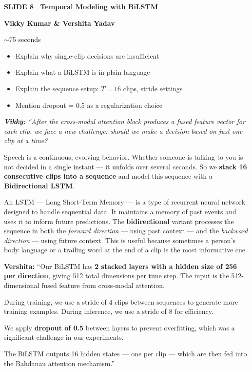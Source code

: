 \documentclass[11pt, a4paper]{article}
\newcommand{\slideheading}[3]{%
  \vspace{0.6cm}
  \begin{tcolorbox}[slidebox]
    \textbf{\color{NavyBlue}SLIDE #1 \textemdash\ #2}\\[2pt]
    \begin{tcolorbox}[presenterbox, title=Presenter(s)]
      \color{AccBlue}\bfseries #3
    \end{tcolorbox}
  \end{tcolorbox}
}
\newcommand{\timing}[1]{%
  \begin{tcolorbox}[timebox, title=Suggested Time]
    \color{AccOrange} #1
  \end{tcolorbox}
}
\newcommand{\keypoints}[1]{%
  \begin{tcolorbox}[keybox, title=Key Points to Cover]
    #1
  \end{tcolorbox}
}
\newcommand{\script}[1]{%
  \begin{mdframed}[
    backgroundcolor=white,
    linecolor=MidText!40,
    linewidth=0.5pt,
    leftmargin=0pt,
    rightmargin=0pt,
    innerleftmargin=10pt,
    innerrightmargin=8pt,
    innertopmargin=8pt,
    innerbottommargin=8pt,
    roundcorner=3pt
  ]
  \itshape\color{MidText}
  #1
  \end{mdframed}
}
\begin{document}
\slideheading{8}{Temporal Modeling with BiLSTM}{Vikky Kumar \& Vershita Yadav}

\timing{$\sim$75 seconds}

\keypoints{%
\begin{itemize}[leftmargin=*, itemsep=2pt]
  \item Explain why single-clip decisions are insufficient
  \item Explain what a BiLSTM is in plain language
  \item Explain the sequence setup: $T=16$ clips, stride settings
  \item Mention dropout = 0.5 as a regularization choice
\end{itemize}
}

\script{%
\textbf{Vikky:} ``After the cross-modal attention block produces a fused feature vector for each clip, we face a new challenge: should we make a decision based on just \textit{one clip} at a time?

Speech is a continuous, evolving behavior. Whether someone is talking to you is not decided in a single instant --- it unfolds over several seconds. So we \textbf{stack 16 consecutive clips into a sequence} and model this sequence with a \textbf{Bidirectional LSTM}.

An LSTM --- Long Short-Term Memory --- is a type of recurrent neural network designed to handle sequential data. It maintains a memory of past events and uses it to inform future predictions. The \textbf{bidirectional} variant processes the sequence in both the \textit{forward direction} --- using past context --- and the \textit{backward direction} --- using future context. This is useful because sometimes a person's body language or a trailing word at the end of a clip is the most informative cue.

\textbf{Vershita:} ``Our BiLSTM has \textbf{2 stacked layers with a hidden size of 256 per direction}, giving 512 total dimensions per time step. The input is the 512-dimensional fused feature from cross-modal attention.

During training, we use a stride of 4 clips between sequences to generate more training examples. During inference, we use a stride of 8 for efficiency.

We apply \textbf{dropout of 0.5} between layers to prevent overfitting, which was a significant challenge in our experiments.

The BiLSTM outputs 16 hidden states --- one per clip --- which are then fed into the Bahdanau attention mechanism.''
}
\end{document}
